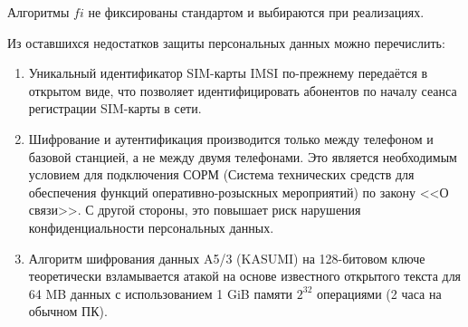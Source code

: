 Алгоритмы $fi$ не фиксированы стандартом и выбираются при реализациях.

Из оставшихся недостатков защиты персональных данных можно перечислить:
\begin{enumerate}
    \item Уникальный идентификатор SIM-карты IMSI по-прежнему передаётся в открытом виде, что позволяет идентифицировать абонентов по началу сеанса регистрации SIM-карты в сети.
    \item Шифрование и аутентификация производится только между телефоном и базовой станцией, а не между двумя телефонами. Это является необходимым условием для подключения СОРМ (Система технических средств для обеспечения функций оперативно-розыскных мероприятий) по закону <<О связи>>. С другой стороны, это повышает риск нарушения конфиденциальности персональных данных.
    \item Алгоритм шифрования данных A5/3 (KASUMI) на 128-битовом ключе теоретически взламывается атакой на основе известного открытого текста для 64 MB данных с использованием 1 GiB памяти $2^{32}$ операциями (2 часа на обычном ПК).
\end{enumerate}
